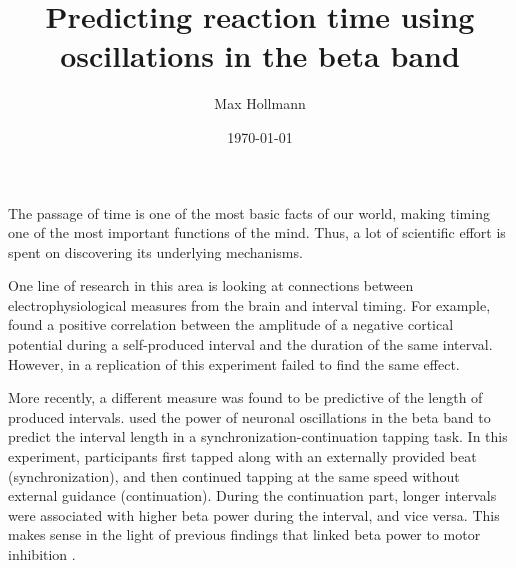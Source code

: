 \documentclass[man,floatsintext]{apa6} %
\title{Predicting reaction time using oscillations in the beta band}
\author{Max Hollmann}
\affiliation{University of Groningen}
\date{\today}
\begin{document}
\maketitle

%


The passage of time is one of the most basic facts of our world, making timing one of the most important functions of the mind.
Thus, a lot of scientific effort is spent on discovering its underlying mechanisms.

One line of research in this area is looking at connections between electrophysiological measures from the brain and interval timing.
For example,  found a positive correlation between the amplitude of a negative cortical potential during a self-produced interval and the duration of the same interval.
However, in a replication of this experiment  failed to find the same effect.

%
More recently, a different measure was found to be predictive of the length of produced intervals.
 used the power of neuronal oscillations in the beta band to predict the interval length in a synchronization-continuation tapping task.
In this experiment, participants first tapped along with an externally provided beat (synchronization), and then continued tapping at the same speed without external guidance (continuation).
During the continuation part, longer intervals were associated with higher beta power during the interval, and vice versa.
This makes sense in the light of previous findings that linked beta power to motor inhibition \cite{joundi_driving_2012}.
\end{document}
